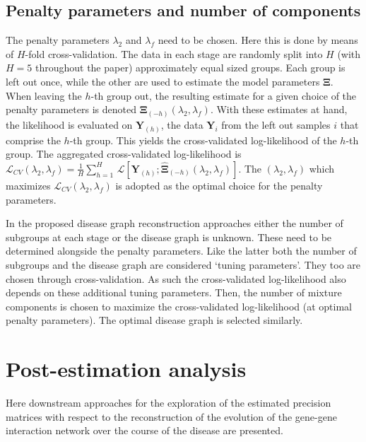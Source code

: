 \documentclass[10pt]{article}
\begin{document}
\subsection{Penalty parameters and number of components}\label{cv}
The penalty parameters $\lambda_2$ and $\lambda_f$ need to be chosen. Here this is done by means of $H$-fold cross-validation. The data in each stage are randomly split into $H$ (with $H=5$ throughout the paper) approximately equal sized groups. Each group is left out once, while the other are used to estimate the model parameters $\mathbf{\Xi}$. When leaving the $h$-th group out, the resulting estimate for a given choice of the penalty parameters is denoted $\widehat{\mathbf{\Xi}}_{(-h)}(\lambda_2, \lambda_f)$. With these estimates at hand, the likelihood is evaluated on $\mathbf{Y}_{(h)}$, the data $\mathbf{Y}_i$ from the left out samples $i$ that comprise the $h$-th group. This yields the cross-validated log-likelihood of the $h$-th group. The aggregated cross-validated log-likelihood is $\mathcal{L}_{CV}(\lambda_2, \lambda_f) = \tfrac{1}{H}\sum_{h=1}^H \, \mathcal{L}[\mathbf{Y}_{(h)}; \widehat{\mathbf{\Xi}}_{(-h)}(\lambda_2, \lambda_f)]$. The $(\lambda_2, \lambda_f)$ which maximizes $\mathcal{L}_{CV}(\lambda_2, \lambda_f)$ is adopted as the optimal choice for the penalty parameters.

In the proposed disease graph reconstruction approaches either the number of subgroups at each stage or the disease graph is unknown. These need to be determined alongside the penalty parameters. Like the latter both the number of subgroups and the disease graph are considered `tuning parameters'. They too are chosen through cross-validation. As such the cross-validated log-likelihood also depends on these additional tuning parameters. Then, the number of mixture components is chosen to maximize the cross-validated log-likelihood (at optimal penalty parameters). The optimal disease graph is selected similarly.


\section{Post-estimation analysis}\label{topology}
Here downstream approaches for the exploration of the estimated precision matrices with respect
to the reconstruction of the evolution of the gene-gene interaction network over the course of the
disease are presented.
\end{document}
